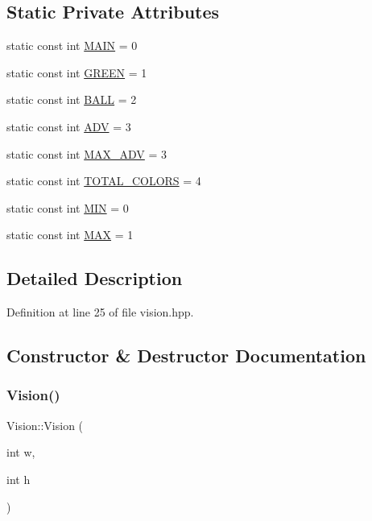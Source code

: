 \subsection*{Static Private Attributes}
\begin{DoxyCompactItemize}
\item 
static const int \hyperlink{class_vision_ae7d1888ee66883aabbdfc7390d338367}{M\+A\+IN} = 0
\item 
static const int \hyperlink{class_vision_aa6daf48b10c075b01c40c4de1240e17f}{G\+R\+E\+EN} = 1
\item 
static const int \hyperlink{class_vision_a08a1f319b2c20419f420bf9c280c4861}{B\+A\+LL} = 2
\item 
static const int \hyperlink{class_vision_ac1903844090d6721f5c854621c516d8f}{A\+DV} = 3
\item 
static const int \hyperlink{class_vision_ad5414bb8b9a738ec032e3673b50c1cb4}{M\+A\+X\+\_\+\+A\+DV} = 3
\item 
static const int \hyperlink{class_vision_a9fbea649a805b17ad9ea18f3f06c14f2}{T\+O\+T\+A\+L\+\_\+\+C\+O\+L\+O\+RS} = 4
\item 
static const int \hyperlink{class_vision_a3824e4ab6a6c9beaceec70f7d3910ed0}{M\+IN} = 0
\item 
static const int \hyperlink{class_vision_af96e82ce8807b3c5e0651f84a04eeb9a}{M\+AX} = 1
\end{DoxyCompactItemize}


\subsection{Detailed Description}


Definition at line 25 of file vision.\+hpp.



\subsection{Constructor \& Destructor Documentation}
\mbox{\label{class_vision_a823f146baaaa771e4e31b021c82fa8ca}} 
\subsubsection{\texorpdfstring{Vision()}{Vision()}}
{\footnotesize\ttfamily Vision\+::\+Vision (\begin{DoxyParamCaption}\item[{int}]{w,  }\item[{int}]{h }\end{DoxyParamCaption})}

